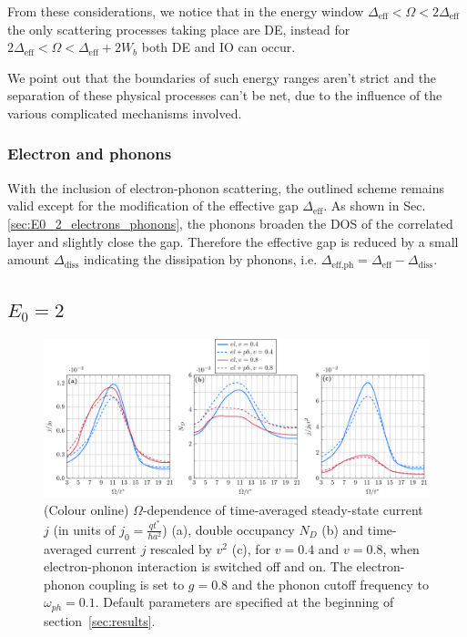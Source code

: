 \documentclass[aps,prb,groupedaddress,showpacs,twocolumn,superscriptaddress,10pt]{revtex4-2}
\begin{document}
From these considerations, we notice that in the energy window $\Delta_{\textrm{eff}}<\Omega<2\Delta_{\textrm{eff}}$ the only scattering processes taking place are DE, instead for $2\Delta_{\textrm{eff}}<\Omega<\Delta_{\textrm{eff}}+2W_b$ both DE and IO can occur. 

We point out that the boundaries of such energy ranges aren't strict and the separation of these physical processes can't be net, due to the influence of the various complicated mechanisms involved.

\subsubsection{Electron and phonons}
\label{sec:scheme_electrons_phonons}  
                            
With the inclusion of electron-phonon scattering, the outlined scheme remains valid except for the modification of the effective gap $\Delta_{\textrm{eff}}$. As shown in Sec.\ref{sec:E0_2_electrons_phonons}, the phonons broaden the DOS of the correlated layer and slightly close the gap. Therefore the effective gap is reduced by a small amount $\Delta_{\textrm{diss}}$ indicating the dissipation by phonons, i.e. $\Delta_{\textrm{eff,ph}}=\Delta_{\textrm{eff}}-\Delta_{\textrm{diss}}$.

\subsection{$E_0=2$}
\label{sec:E0_2}
  

\begin{figure}[ht]
\includegraphics[width=\textwidth]{./figures_Paper1/j_vs_omega_mu1_v_0.4_0.8_eph.pdf}
\caption{(Colour online) $\Omega$-dependence of time-averaged steady-state current $j$ (in units of $j_0=\frac{qt^*}{\hbar a^2}$) (a), double occupancy $N_D$ (b) and time-averaged current $j$ rescaled by $v^2$ (c), for $v=0.4$ and $v=0.8$, when electron-phonon interaction is switched off and on. The electron-phonon coupling is set to $g=0.8$ and the phonon cutoff frequency to $\omega_{ph}=0.1$. Default parameters are specified at the beginning of section~\ref{sec:results}.} 
\label{fig:j_vs_omega_mu1_v_0.4_0.8_eph}
\end{figure}     
  
\end{document}
